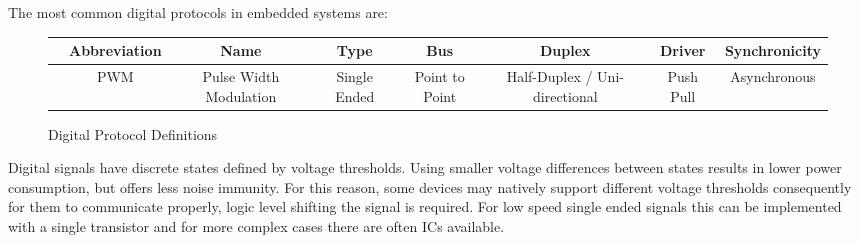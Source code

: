 \documentclass[main.tex]{subfiles}
\begin{document}
The most common digital protocols in embedded systems are:
\begin{figure}[h!]
    \centering
    \begin{tabular}{|c|c|c|c|c|c|c|c|}
        \hline 
        & Abbreviation & Name & Type & Bus & Duplex & Driver & Synchronicity \\ \hline
        & PWM & Pulse Width Modulation & Single Ended & Point to Point & Half-Duplex / Uni-directional & Push Pull & Asynchronous \\ \hline
        

    \end{tabular}
    \caption{Digital Protocol Definitions}
    \label{fig:digital_protocols}
\end{figure}

Digital signals have discrete states defined by voltage thresholds. Using smaller voltage differences between states results in lower power consumption, but offers less noise immunity. For this reason, some devices may natively support different voltage thresholds consequently for them to communicate properly, logic level shifting the signal is required. For low speed single ended signals this can be implemented with a single transistor and for more complex cases there are often ICs available. 

\end{document}
